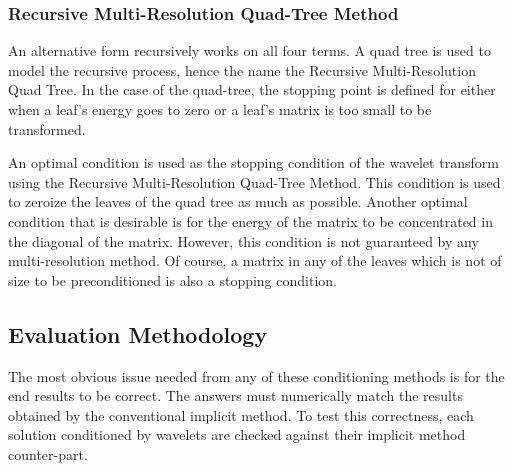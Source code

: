 \subsubsection {Recursive Multi-Resolution Quad-Tree Method}
An alternative form recursively works on all four terms.  A quad tree is used to model the recursive process, hence the name the Recursive Multi-Resolution Quad Tree.   In the case of the quad-tree, the stopping point is defined for either when a leaf's energy goes to zero or a leaf's matrix is too small to be transformed.  

An optimal condition is used as the stopping condition of the wavelet transform using the Recursive Multi-Resolution Quad-Tree Method.   %
This condition is used to zeroize the leaves of the quad tree as much as possible.  %
Another optimal condition that is desirable is for the energy of the matrix to be concentrated in the diagonal of the matrix.  However, this condition is not guaranteed by any multi-resolution method.   Of course, a matrix in any of the leaves which is not of size to be preconditioned is also a stopping condition.  



\subsection {Evaluation Methodology}
The most obvious issue needed from any of %
 these conditioning methods is for the end results to be correct.  The answers must numerically match the results obtained by the conventional implicit method.  To test this correctness, each solution conditioned by wavelets are checked against their implicit method counter-part.  

